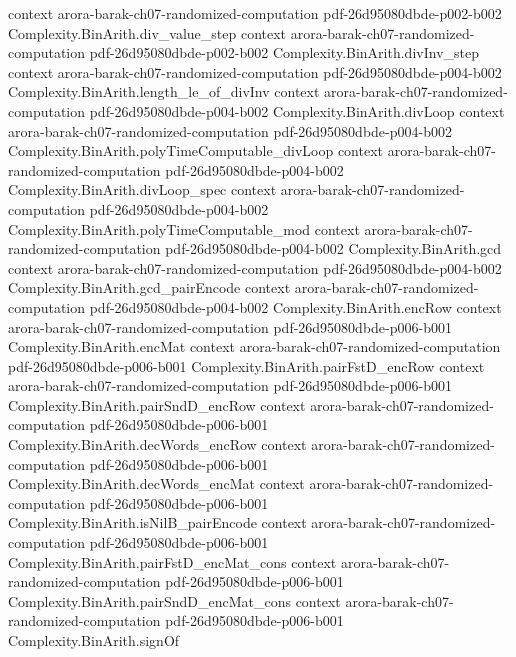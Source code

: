 \begin{theorem}
  {context}
  {arora-barak-ch07-randomized-computation}
  {pdf-26d95080dbde-p002-b002}
\proofstep
  {Complexity.BinArith.div_value_step}
  {context}
  {arora-barak-ch07-randomized-computation}
  {pdf-26d95080dbde-p002-b002}
\proofstep
  {Complexity.BinArith.divInv_step}
  {context}
  {arora-barak-ch07-randomized-computation}
  {pdf-26d95080dbde-p004-b002}
\proofstep
  {Complexity.BinArith.length_le_of_divInv}
  {context}
  {arora-barak-ch07-randomized-computation}
  {pdf-26d95080dbde-p004-b002}
\proofstep
  {Complexity.BinArith.divLoop}
  {context}
  {arora-barak-ch07-randomized-computation}
  {pdf-26d95080dbde-p004-b002}
\proofstep
  {Complexity.BinArith.polyTimeComputable_divLoop}
  {context}
  {arora-barak-ch07-randomized-computation}
  {pdf-26d95080dbde-p004-b002}
\proofstep
  {Complexity.BinArith.divLoop_spec}
  {context}
  {arora-barak-ch07-randomized-computation}
  {pdf-26d95080dbde-p004-b002}
\proofstep
  {Complexity.BinArith.polyTimeComputable_mod}
  {context}
  {arora-barak-ch07-randomized-computation}
  {pdf-26d95080dbde-p004-b002}
\proofstep
  {Complexity.BinArith.gcd}
  {context}
  {arora-barak-ch07-randomized-computation}
  {pdf-26d95080dbde-p004-b002}
\proofstep
  {Complexity.BinArith.gcd_pairEncode}
  {context}
  {arora-barak-ch07-randomized-computation}
  {pdf-26d95080dbde-p004-b002}
\proofstep
  {Complexity.BinArith.encRow}
  {context}
  {arora-barak-ch07-randomized-computation}
  {pdf-26d95080dbde-p006-b001}
\proofstep
  {Complexity.BinArith.encMat}
  {context}
  {arora-barak-ch07-randomized-computation}
  {pdf-26d95080dbde-p006-b001}
\proofstep
  {Complexity.BinArith.pairFstD_encRow}
  {context}
  {arora-barak-ch07-randomized-computation}
  {pdf-26d95080dbde-p006-b001}
\proofstep
  {Complexity.BinArith.pairSndD_encRow}
  {context}
  {arora-barak-ch07-randomized-computation}
  {pdf-26d95080dbde-p006-b001}
\proofstep
  {Complexity.BinArith.decWords_encRow}
  {context}
  {arora-barak-ch07-randomized-computation}
  {pdf-26d95080dbde-p006-b001}
\proofstep
  {Complexity.BinArith.decWords_encMat}
  {context}
  {arora-barak-ch07-randomized-computation}
  {pdf-26d95080dbde-p006-b001}
\proofstep
  {Complexity.BinArith.isNilB_pairEncode}
  {context}
  {arora-barak-ch07-randomized-computation}
  {pdf-26d95080dbde-p006-b001}
\proofstep
  {Complexity.BinArith.pairFstD_encMat_cons}
  {context}
  {arora-barak-ch07-randomized-computation}
  {pdf-26d95080dbde-p006-b001}
\proofstep
  {Complexity.BinArith.pairSndD_encMat_cons}
  {context}
  {arora-barak-ch07-randomized-computation}
  {pdf-26d95080dbde-p006-b001}
\proofstep
  {Complexity.BinArith.signOf}

\end{theorem}
